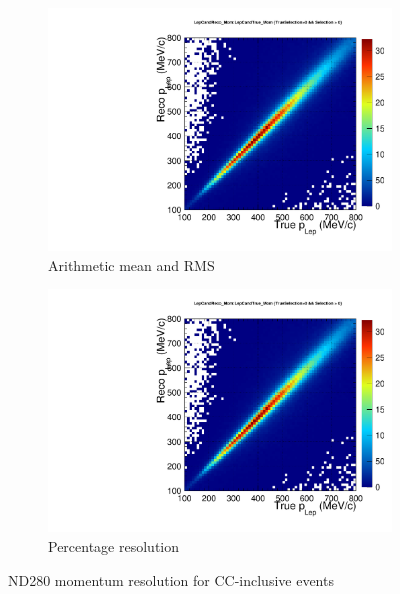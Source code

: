 \begin{figure}[h]
	\begin{subfigure}[t]{0.49\textwidth}
		\includegraphics[width=\textwidth, trim={0mm 0mm 0mm 0mm}, clip,page=2]{figures/det/resolution/LepCandTrue_And_Reco_Pmu_ForJacob}
		\caption{Arithmetic mean and RMS}
	\end{subfigure}
\begin{subfigure}[t]{0.49\textwidth}
\includegraphics[width=\textwidth, trim={0mm 0mm 0mm 0mm}, clip,page=3]{figures/det/resolution/LepCandTrue_And_Reco_Pmu_ForJacob}
\caption{Percentage resolution}
\end{subfigure}

	\caption{ND280 momentum resolution for CC-inclusive events}
	\label{fig:detector_resolution_pmu}
\end{figure}

